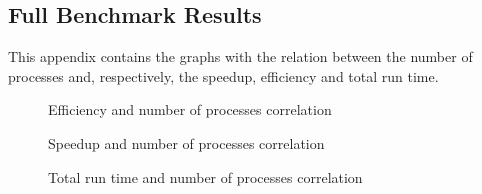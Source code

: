 \subsection{Full Benchmark Results}

This appendix contains the graphs with the relation between the number of processes and, respectively, the speedup, efficiency and total run time.

\begin{figure}[!ht]
    \centering
    
    
    
    
    \caption{Efficiency and number of processes correlation}
\end{figure}

\begin{figure}[!ht]
    \centering
    
    
    
    
    \caption{Speedup and number of processes correlation}
\end{figure}

\begin{figure}[!ht]
    \centering
    
    
    
    
    \caption{Total run time and number of processes correlation}
\end{figure}
